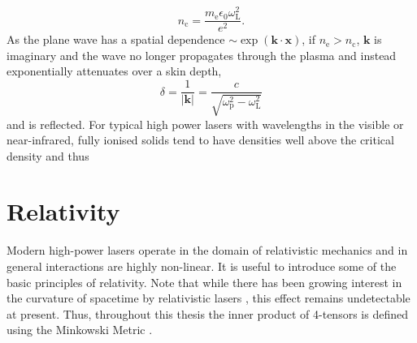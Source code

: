 \begin{equation}
	n_\mathrm{c} = \frac{m_\mathrm{e}\epsilon_0 \omega_\mathrm{L}^2}{e^2}.
\end{equation}
As the plane wave has a spatial dependence $\sim \exp{(\mathbf{k}\cdot\mathbf{x})}$, if $n_\mathrm{e} > n_\mathrm{c}$, $\mathbf{k}$ is imaginary and the wave no longer propagates through the plasma and instead exponentially attenuates over a skin depth,
\begin{equation}
	\delta = \frac{1}{|\mathbf{k}|} = \frac{c}{\sqrt{\omega_\mathrm{p}^2 - \omega_\mathrm{L}^2}}
\end{equation}
and is reflected. For typical high power lasers with wavelengths in the visible or near-infrared, fully ionised solids tend to have densities well above the critical density and thus 

\section{Relativity}
Modern high-power lasers operate in the domain of relativistic mechanics and in general interactions are highly non-linear. It is useful to introduce some of the basic principles of relativity. Note that while there has been growing interest in the curvature of spacetime by relativistic lasers \cite{atongaGravitationalWavesHighpower2023}, this effect remains undetectable at present. Thus, throughout this thesis the inner product of 4-tensors is defined using the Minkowski Metric \cite{steaneRelativityMadeRelatively2012}. 


